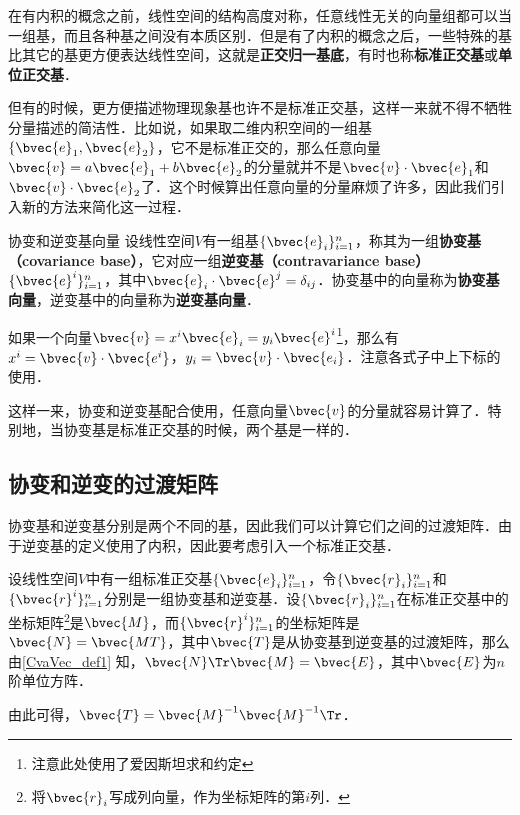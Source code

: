 

在有内积的概念之前，线性空间的结构高度对称，任意线性无关的向量组都可以当一组基，而且各种基之间没有本质区别．但是有了内积的概念之后，一些特殊的基比其它的基更方便表达线性空间，这就是\textbf{正交归一基底}，有时也称\textbf{标准正交基}或\textbf{单位正交基}．

但有的时候，更方便描述物理现象基也许不是标准正交基，这样一来就不得不牺牲分量描述的简洁性．比如说，如果取二维内积空间的一组基$\{\bvec{e}_1, \bvec{e}_2\}$，它不是标准正交的，那么任意向量$\bvec{v}=a\bvec{e}_1+b\bvec{e}_2$的分量就并不是$\bvec{v}\cdot\bvec{e}_1$和$\bvec{v}\cdot\bvec{e}_2$了．这个时候算出任意向量的分量麻烦了许多，因此我们引入新的方法来简化这一过程．

\begin{definition}{协变和逆变基向量}\label{CvaVec_def1}
设线性空间$V$有一组基$\{\bvec{e}_i\}_{i=1}^n$，称其为一组\textbf{协变基（covariance base）}，它对应一组\textbf{逆变基（contravariance base）}$\{\bvec{e}^i\}_{i=1}^n$，其中$\bvec{e}_i\cdot\bvec{e}^j=\delta_{ij}$．协变基中的向量称为\textbf{协变基向量}，逆变基中的向量称为\textbf{逆变基向量}．
\end{definition}

如果一个向量$\bvec{v}=x^i\bvec{e}_i=y_i\bvec{e}^i$\footnote{注意此处使用了爱因斯坦求和约定}，那么有$x^i=\bvec{v}\cdot\bvec{e^i}$，$y_i=\bvec{v}\cdot\bvec{e_i}$．注意各式子中上下标的使用．

这样一来，协变和逆变基配合使用，任意向量$\bvec{v}$的分量就容易计算了．特别地，当协变基是标准正交基的时候，两个基是一样的．

\subsection{协变和逆变的过渡矩阵}


协变基和逆变基分别是两个不同的基，因此我们可以计算它们之间的过渡矩阵．由于逆变基的定义使用了内积，因此要考虑引入一个标准正交基．

设线性空间$V$中有一组标准正交基$\{\bvec{e}_i\}^n_{i=1}$，令$\{\bvec{r}_i\}^n_{i=1}$和$\{\bvec{r}^i\}^n_{i=1}$分别是一组协变基和逆变基．设$\{\bvec{r}_i\}^n_{i=1}$在标准正交基中的坐标矩阵\footnote{将$\bvec{r}_i$写成列向量，作为坐标矩阵的第$i$列．}是$\bvec{M}$，而$\{\bvec{r}^i\}^n_{i=1}$的坐标矩阵是$\bvec{N}=\bvec{MT}$，其中$\bvec{T}$是从协变基到逆变基的过渡矩阵，那么由\autoref{CvaVec_def1} 知，$\bvec{N}\Tr\bvec{M}=\bvec{E}$，其中$\bvec{E}$为$n$阶单位方阵．

由此可得，$\bvec{T}=\bvec{M}^{-1}{\bvec{M}^{-1}}\Tr$．




